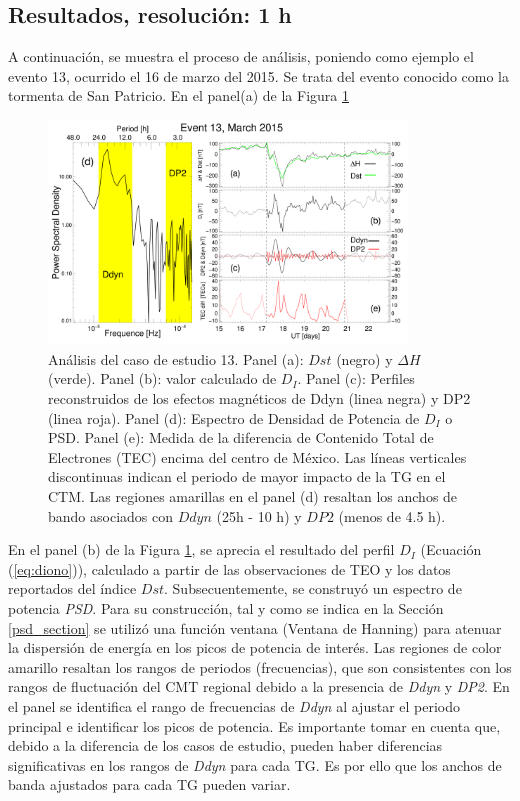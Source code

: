 \subsection{Resultados, resolución: 1 h}
\label{resultados}
A continuación, se muestra el proceso de análisis, poniendo como ejemplo el evento 13, ocurrido el 16 de marzo del 2015. Se trata del evento conocido como la tormenta de San Patricio. En el panel(a) de la Figura \ref{fig:iono_resp}
\vspace{1 em}

\begin{figure}
\centering
    \includegraphics[width=0.85\textwidth]{Images/iono_PI_2015-03-15.png}
    \caption{Análisis del caso de estudio 13. Panel (a): $Dst$ (negro) y $\Delta H$ (verde). Panel (b): valor calculado de $D_I$. Panel (c): Perfiles reconstruidos de los efectos magnéticos de Ddyn (linea negra) y DP2 (linea roja). Panel (d): Espectro de Densidad de Potencia de $D_I$ o PSD. Panel (e): Medida de la diferencia de Contenido Total de Electrones (TEC) encima del centro de México. Las líneas verticales discontinuas indican el periodo de mayor impacto de la TG en el CTM. Las regiones amarillas en el panel (d) resaltan los anchos de bando asociados con  $Ddyn$ (25h - 10 h) y $DP2$ (menos de 4.5 h).}
    \label{fig:iono_resp}
\end{figure}

En el panel (b) de la Figura \ref{fig:iono_resp}, se aprecia el resultado del perfil $D_I$ (Ecuación (\ref{eq:diono})), calculado a partir de las observaciones de TEO y los datos reportados del índice $Dst$. Subsecuentemente, se construyó un espectro de potencia \emph{PSD}. Para su construcción, tal y como se indica en la Sección \ref{psd_section} se utilizó una función ventana (Ventana de Hanning) para atenuar la dispersión de energía en los picos de potencia de interés. Las regiones de color amarillo resaltan los rangos de periodos (frecuencias), que son consistentes con los rangos de fluctuación del CMT regional debido a la presencia de \emph{Ddyn} y \emph{DP2}. En el panel se identifica el rango de frecuencias de \emph{Ddyn} al ajustar el periodo principal e identificar los picos de potencia. Es importante tomar en cuenta que, debido a la diferencia de los casos de estudio, pueden haber diferencias significativas en los rangos de \emph{Ddyn} para cada TG. Es por ello que los anchos de banda ajustados para cada TG pueden variar. 
\vspace{1 em}


